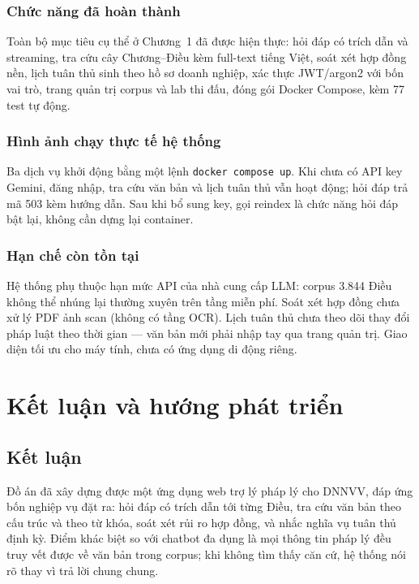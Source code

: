 \documentclass[12pt,a4paper]{report}
\numberwithin{equation}{chapter}
\numberwithin{figure}{chapter}
\numberwithin{table}{chapter}
\newcommand{\soDieu}{3.844}
\newcommand{\soTest}{77}
\begin{document}
\subsection{Chức năng đã hoàn thành}

Toàn bộ mục tiêu cụ thể ở Chương~1 đã được hiện thực: hỏi đáp có trích dẫn và
streaming, tra cứu cây Chương--Điều kèm full-text tiếng Việt, soát xét hợp đồng
nền, lịch tuân thủ sinh theo hồ sơ doanh nghiệp, xác thực JWT/argon2 với bốn vai
trò, trang quản trị corpus và lab thi đấu, đóng gói Docker Compose, kèm
\soTest{} test tự động.

\subsection{Hình ảnh chạy thực tế hệ thống}

Ba dịch vụ khởi động bằng một lệnh \texttt{docker compose up}. Khi chưa có API
key Gemini, đăng nhập, tra cứu văn bản và lịch tuân thủ vẫn hoạt động; hỏi đáp
trả mã 503 kèm hướng dẫn. Sau khi bổ sung key, gọi reindex là chức năng hỏi đáp
bật lại, không cần dựng lại container.

\subsection{Hạn chế còn tồn tại}

Hệ thống phụ thuộc hạn mức API của nhà cung cấp LLM: corpus \soDieu{} Điều không
thể nhúng lại thường xuyên trên tầng miễn phí. Soát xét hợp đồng chưa xử lý PDF
ảnh scan (không có tầng OCR). Lịch tuân thủ chưa theo dõi thay đổi pháp luật theo
thời gian --- văn bản mới phải nhập tay qua trang quản trị. Giao diện tối ưu cho
máy tính, chưa có ứng dụng di động riêng.


\chapter{Kết luận và hướng phát triển}

\section{Kết luận}

Đồ án đã xây dựng được một ứng dụng web trợ lý pháp lý cho DNNVV, đáp ứng bốn
nghiệp vụ đặt ra: hỏi đáp có trích dẫn tới từng Điều, tra cứu văn bản theo cấu
trúc và theo từ khóa, soát xét rủi ro hợp đồng, và nhắc nghĩa vụ tuân thủ định kỳ.
Điểm khác biệt so với chatbot đa dụng là mọi thông tin pháp lý đều truy vết được
về văn bản trong corpus; khi không tìm thấy căn cứ, hệ thống nói rõ thay vì trả
lời chung chung.
\end{document}
